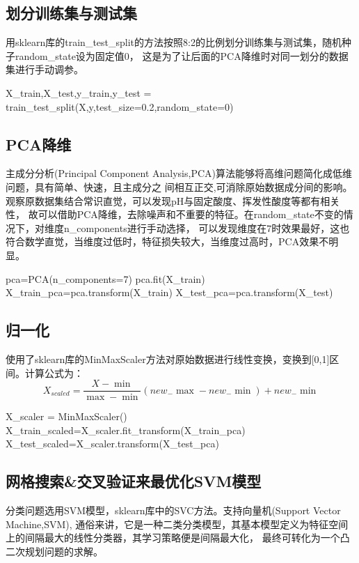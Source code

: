 \documentclass[UTF8]{ctexart}
\begin{document}
        \subsection{划分训练集与测试集}
        用sklearn库的train\_test\_split的方法按照8:2的比例划分训练集与测试集，随机种子random\_state设为固定值0，
        这是为了让后面的PCA降维时对同一划分的数据集进行手动调参。
            \begin{python}
X_train,X_test,y_train,y_test = train_test_split(X,y,test_size=0.2,random_state=0) 
            \end{python}
        \subsection{PCA降维}
        主成分分析(Principal Component Analysis,PCA)算法能够将高维问题简化成低维问题，具有简单、快速，且主成分之
        间相互正交,可消除原始数据成分间的影响。观察原数据集结合常识直觉，可以发现pH与固定酸度、挥发性酸度等都有相关性，
        故可以借助PCA降维，去除噪声和不重要的特征。在random\_state不变的情况下，对维度n\_components进行手动选择，
        可以发现维度在7时效果最好，这也符合数学直觉，当维度过低时，特征损失较大，当维度过高时，PCA效果不明显。
            \begin{python}
pca=PCA(n_components=7)
pca.fit(X_train)
X_train_pca=pca.transform(X_train)
X_test_pca=pca.transform(X_test)            
            \end{python}
        \subsection{归一化}
        使用了sklearn库的MinMaxScaler方法对原始数据进行线性变换，变换到[0,1]区间。计算公式为：
        \begin{equation}
            X_{scaled}=\frac{X-\min }{\max -\min }\left(n e w_{-} \max -n e w_{-} \min \right)+n e w_{-} \min
        \end{equation}
            \begin{python}
X_scaler = MinMaxScaler()
X_train_scaled=X_scaler.fit_transform(X_train_pca)
X_test_scaled=X_scaler.transform(X_test_pca)
            \end{python}
        \subsection{网格搜索\&交叉验证来最优化SVM模型}
        分类问题选用SVM模型，sklearn库中的SVC方法。支持向量机(Support Vector Machine,SVM),
        通俗来讲，它是一种二类分类模型，其基本模型定义为特征空间上的间隔最大的线性分类器，其学习策略便是间隔最大化，
        最终可转化为一个凸二次规划问题的求解。
\end{document}
